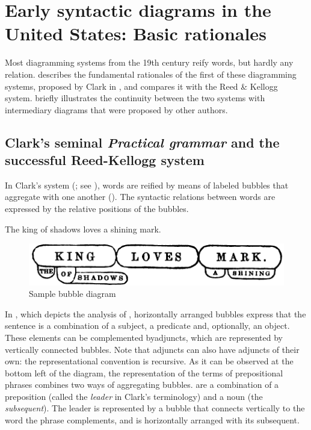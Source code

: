\documentclass[output=paper]{langsci/langscibook}
\begin{document}
\section{Early syntactic diagrams in the United States: Basic rationales}\label{sec:4:3}

Most diagramming systems from the 19th century reify words, but hardly any relation.  describes the fundamental rationales of the first of these diagramming systems, proposed by Clark in \citeyear{clark_science_1847}, and compares it with the Reed \& Kellogg system.  briefly illustrates the continuity between the two systems with intermediary diagrams that were proposed by other authors.

\subsection{Clark’s seminal \textit{Practical grammar} and the successful Reed-Kellogg system}\label{sec:4:3.1}

In Clark’s system (\citeyear{clark_science_1847}; see \citealt{mazziotta_drawing_2016}), words are reified by means of labeled bubbles that aggregate with one another (). The syntactic relations between words are expressed by the relative positions of the bubbles. 

\ea \label{ex:4:2} The king of shadows loves a shining mark.
\z
  
\begin{figure}
    \includegraphics[width=.75\textwidth]{figures/04/Clark.png}
    \caption{Sample bubble diagram \citep[23]{clark_science_1847}\label{fig:4:3}}
\end{figure}

In , which depicts the analysis of , horizontally arranged bubbles express that the sentence is a combination of a  subject, a predicate and, optionally, an object. These elements can be complemented byadjuncts, which are represented by vertically connected bubbles. Note that adjuncts can also have adjuncts of their own: the representational convention is recursive. As it can be observed at the bottom left of the diagram, the representation of the terms of prepositional phrases combines two ways of aggregating bubbles.  are a combination of a preposition (called the \textit{leader} in Clark’s terminology) and a noun (the \textit{subsequent}). The leader is represented by a bubble that connects vertically to the word the phrase complements, and is horizontally arranged with its subsequent.
\end{document}
